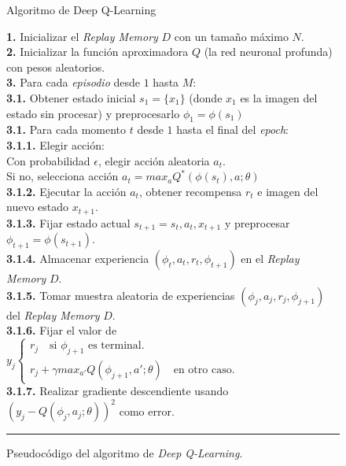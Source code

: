 \begin{figure}[h]
\begin{algorithm}[H]
\caption{Algoritmo de Deep Q-Learning}
\textbf{1.} Inicializar el \textit{Replay Memory} $D$ con un tamaño máximo $N$.\\
\textbf{2.} Inicializar la función aproximadora $Q$ (la red neuronal profunda) con pesos aleatorios.\\
\textbf{3.} Para cada \textit{episodio} desde $1$ hasta $M$:\\
\Indp \textbf{3.1.} Obtener estado inicial $s_{1} = \{x_{1}\}$ (donde $x_{1}$ es la imagen del estado sin procesar) y preprocesarlo $\phi_{1}=\phi(s_{1})$\\
\textbf{3.1.} Para cada momento $t$ desde $1$ hasta el final del \textit{epoch}:\\
\Indp \textbf{3.1.1.} Elegir acción:\\
\Indp \Indp Con probabilidad $\epsilon$, elegir acción aleatoria $a_{t}$.\\
Si no, selecciona acción $a_{t} = max_{a}Q^{*}(\phi(s_{t}),a;\theta)$\\
\Indm \Indm \textbf{3.1.2.} Ejecutar la acción $a_{t}$, obtener recompensa $r_{t}$ e imagen del nuevo estado $x_{t+1}$.\\
\textbf{3.1.3.} Fijar estado actual $s_{t+1}=s_{t},a_{t},x_{t+1}$ y preprocesar $\phi_{t+1}=\phi(s_{t+1})$.\\
\textbf{3.1.4.} Almacenar experiencia $(\phi_{t}, a_{t}, r_{t}, \phi_{t+1})$ en el \textit{Replay Memory} $D$.\\
\textbf{3.1.5.} Tomar muestra aleatoria de experiencias $(\phi_{j}, a_{j}, r_{j}, \phi_{j+1})$ del \textit{Replay Memory} $D$.\\
\textbf{3.1.6.} Fijar el valor de $y_{j} \begin{cases}
r_{j} \quad \text{si $\phi_{j+1}$ es terminal.}\\
r_{j}+\gamma max_{a'} Q(\phi_{j+1},a';\theta) \quad \text{en otro caso.}
\end{cases}$\\
\textbf{3.1.7.} Realizar gradiente descendiente usando $(y_{j}-Q(\phi_{j},a_{j};\theta))^{2}$ como error.
\end{algorithm}
\hrule
\caption{Pseudocódigo del algoritmo de \textit{Deep Q-Learning}.}
\label{alg:chap3-dql}
\end{figure}

